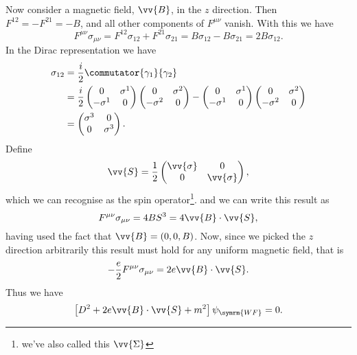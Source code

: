 \documentclass[fleqn]{NotesClass}
\newcommand{\covariantDerivative}{D}
\begin{document}
    Now consider a magnetic field, \(\vv{B}\), in the \(z\) direction.
    Then \(F^{12} = -F^{21} = -B\), and all other components of \(F^{\mu\nu}\) vanish.
    With this we have
    \begin{equation}
        F^{\mu\nu}\sigma_{\mu\nu} = F^{12}\sigma_{12} + F^{21}\sigma_{21} = B\sigma_{12} - B\sigma_{21} = 2B\sigma_{12}.
    \end{equation}
    In the Dirac representation we have
    \begin{align}
        \sigma_{12} &= \frac{i}{2}\commutator{\gamma_1}{\gamma_2}\\
        &= \frac{i}{2}
        \begin{pmatrix}
            0 & \sigma^1\\
            -\sigma^1 & 0
        \end{pmatrix}
        \begin{pmatrix}
            0 & \sigma^2\\
            -\sigma^2 & 0
        \end{pmatrix}
        -
        \begin{pmatrix}
            0 & \sigma^1\\
            -\sigma^1 & 0
        \end{pmatrix}
        \begin{pmatrix}
            0 & \sigma^2\\
            -\sigma^2 & 0
        \end{pmatrix}
        \\
        &= 
        \begin{pmatrix}
            \sigma^3 & 0\\
            0 & \sigma^3
        \end{pmatrix}
        .
    \end{align}
    Define
    \begin{equation}
        \vv{S} = \frac{1}{2}
        \begin{pmatrix}
            \vv{\sigma} & 0\\
            0 & \vv{\sigma}
        \end{pmatrix}
        ,
    \end{equation}
    which we can recognise as the spin operator\footnote{we've also called this \(\vv{\Sigma}\)}.
    and we can write this result as
    \begin{equation}
        F^{\mu\nu}\sigma_{\mu\nu} = 4BS^3 = 4 \vv{B} \cdot \vv{S},
    \end{equation}
    having used the fact that \(\vv{B} = (0, 0, B)\).
    Now, since we picked the \(z\) direction arbitrarily this result must hold for any uniform magnetic field, that is
    \begin{equation}
        -\frac{e}{2}F^{\mu\nu}\sigma_{\mu\nu} = 2e\vv{B} \cdot \vv{S}.
    \end{equation}
    Thus we have
    \begin{equation}
        \left[ \covariantDerivative^2 + 2e\vv{B} \cdot \vv{S} + m^2 \right] \psi_{\symrm{WF}} = 0.
    \end{equation}
    
\end{document}
